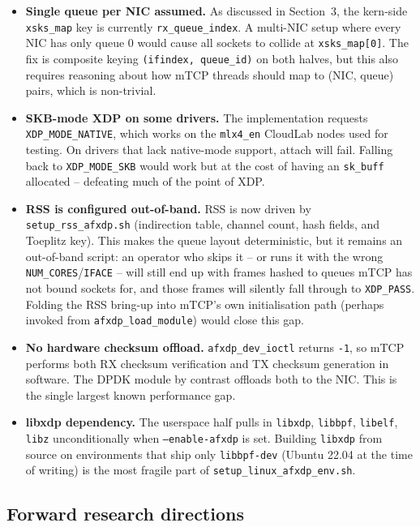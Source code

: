 \documentclass[10pt, letterpaper, twocolumn]{article}
\begin{document}
\begin{itemize}
    \item \textbf{Single queue per NIC assumed.} As discussed in Section~3, the kern-side \texttt{xsks\_map} key is currently \texttt{rx\_queue\_index}. A multi-NIC setup where every NIC has only queue 0 would cause all sockets to collide at \texttt{xsks\_map[0]}. The fix is composite keying \texttt{(ifindex, queue\_id)} on both halves, but this also requires reasoning about how mTCP threads should map to (NIC, queue) pairs, which is non-trivial.
    \item \textbf{SKB-mode XDP on some drivers.} The implementation requests \texttt{XDP\_MODE\_NATIVE}, which works on the \texttt{mlx4\_en} CloudLab nodes used for testing. On drivers that lack native-mode support, attach will fail. Falling back to \texttt{XDP\_MODE\_SKB} would work but at the cost of having an \texttt{sk\_buff} allocated -- defeating much of the point of XDP.
    \item \textbf{RSS is configured out-of-band.} RSS is now driven by \texttt{setup\_rss\_afxdp.sh} (indirection table, channel count, hash fields, and Toeplitz key). This makes the queue layout deterministic, but it remains an out-of-band script: an operator who skips it -- or runs it with the wrong \texttt{NUM\_CORES}/\texttt{IFACE} -- will still end up with frames hashed to queues mTCP has not bound sockets for, and those frames will silently fall through to \texttt{XDP\_PASS}. Folding the RSS bring-up into mTCP's own initialisation path (perhaps invoked from \texttt{afxdp\_load\_module}) would close this gap.
    \item \textbf{No hardware checksum offload.} \texttt{afxdp\_dev\_ioctl} returns \texttt{-1}, so mTCP performs both RX checksum verification and TX checksum generation in software. The DPDK module by contrast offloads both to the NIC. This is the single largest known performance gap.
    \item \textbf{libxdp dependency.} The userspace half pulls in \texttt{libxdp}, \texttt{libbpf}, \texttt{libelf}, \texttt{libz} unconditionally when \texttt{--enable-afxdp} is set. Building \texttt{libxdp} from source on environments that ship only \texttt{libbpf-dev} (Ubuntu 22.04 at the time of writing) is the most fragile part of \texttt{setup\_linux\_afxdp\_env.sh}.
\end{itemize}

\subsection{Forward research directions}
\end{document}
